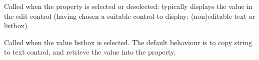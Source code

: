 

Called when the property is selected or deselected: typically displays the value
in the edit control (having chosen a suitable control to display: (non)editable text or listbox).



Called when the value listbox is selected. The default behaviour is to copy
string to text control, and retrieve the value into the property.

